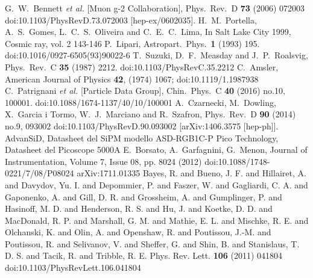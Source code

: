 \begin{thebibliography}{99}
G.~W.~Bennett {\it et al.} [Muon g-2 Collaboration],
Phys.\ Rev.\ D {\bf 73} (2006) 072003
doi:10.1103/PhysRevD.73.072003
[hep-ex/0602035].
H.~M.~Portella, A.~S.~Gomes, L.~C.~S.~Oliveira and C.~E.~C.~Lima,
In Salt Lake City 1999, Cosmic ray, vol. 2 143-146
P.~Lipari,
Astropart.\ Phys.\  {\bf 1} (1993) 195.
doi:10.1016/0927-6505(93)90022-6
T.~Suzuki, D.~F.~Measday and J.~P.~Roalsvig,
Phys.\ Rev.\ C {\bf 35} (1987) 2212.
doi:10.1103/PhysRevC.35.2212
C.~Amsler, 
American Journal of Physics {\bf 42}, (1974) 1067;  
doi:10.1119/1.1987938
C.~Patrignani {\it et al.} [Particle Data Group],
Chin.\ Phys.\ C {\bf 40} (2016) no.10,  100001.
doi:10.1088/1674-1137/40/10/100001
A.~Czarnecki, M.~Dowling, X.~Garcia i Tormo, W.~J.~Marciano and R.~Szafron,
Phys.\ Rev.\ D {\bf 90} (2014) no.9,  093002
doi:10.1103/PhysRevD.90.093002
[arXiv:1406.3575 [hep-ph]].
AdvanSiD,
Datasheet del SiPM modello ASD-RGB1C-P
Pico Technology,
Datasheet del Picoscope 5000A
E.~Borsato, A.~Garfagnini, G.~Menon,
Journal of Instrumentation, Volume 7, Issue 08, pp. 8024 (2012)
doi:10.1088/1748-0221/7/08/P08024
arXiv:1711.01335
Bayes, R. and Bueno, J. F. and Hillairet, A. and Davydov, Yu. I. and Depommier, P. and Faszer, W. and Gagliardi, C. A. and Gaponenko, A. and Gill, D. R. and Grossheim, A. and Gumplinger, P. and Hasinoff, M. D. and Henderson, R. S. and Hu, J. and Koetke, D. D. and MacDonald, R. P. and Marshall, G. M. and Mathie, E. L. and Mischke, R. E. and Olchanski, K. and Olin, A. and Openshaw, R. and Poutissou, J.-M. and Poutissou, R. and Selivanov, V. and Sheffer, G. and Shin, B. and Stanislaus, T. D. S. and Tacik, R. and Tribble, R. E.
Phys. Rev. Lett. {\bf 106} (2011) 041804
doi:10.1103/PhysRevLett.106.041804
\end{thebibliography}

